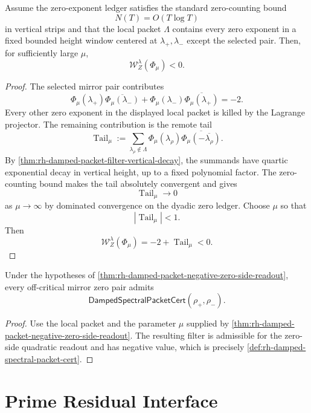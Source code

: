 \begin{theorem}
\label{thm:rh-damped-packet-negative-zero-side-readout}
Assume the zero-exponent ledger satisfies the standard zero-counting
bound
$$
N(T)=O(T\log T)
$$
in vertical strips and that the local packet $\Lambda$ contains every
zero exponent in a fixed bounded height window centered at
$\lambda_+,\lambda_-$ except the selected pair.  Then, for sufficiently
large $\mu$,
$$
\mathcal W_Z^\lambda(\Phi_\mu)<0.
$$
\end{theorem}

\begin{proof}
The selected mirror pair contributes
$$
\Phi_\mu(\lambda_+)\overline{\Phi_\mu(\lambda_-)}
+
\Phi_\mu(\lambda_-)\overline{\Phi_\mu(\lambda_+)}
=
-2.
$$
Every other zero exponent in the displayed local packet is killed by
the Lagrange projector.  The remaining contribution is the remote tail
$$
\operatorname{Tail}_\mu
:=
\sum_{\lambda_\rho\notin\Lambda}
\Phi_\mu(\lambda_\rho)
\overline{\Phi_\mu(-\overline{\lambda_\rho})}.
$$
By \autoref{thm:rh-damped-packet-filter-vertical-decay}, the summands
have quartic exponential decay in vertical height, up to a fixed
polynomial factor.  The zero-counting bound makes the tail absolutely
convergent and gives
$$
\operatorname{Tail}_\mu\to0
$$
as $\mu\to\infty$ by dominated convergence on the dyadic zero ledger.
Choose $\mu$ so that
$$
|\operatorname{Tail}_\mu|<1.
$$
Then
$$
\mathcal W_Z^\lambda(\Phi_\mu)
=
-2+\operatorname{Tail}_\mu
<
0.
$$
\end{proof}

\begin{corollary}
\label{cor:rh-offcritical-mirrors-supply-damped-spectral-packets}
Under the hypotheses of
\autoref{thm:rh-damped-packet-negative-zero-side-readout}, every
off-critical mirror zero pair admits
$$
\mathsf{DampedSpectralPacketCert}(\rho_+,\rho_-).
$$
\end{corollary}

\begin{proof}
Use the local packet and the parameter $\mu$ supplied by
\autoref{thm:rh-damped-packet-negative-zero-side-readout}.  The
resulting filter is admissible for the zero-side quadratic readout and
has negative value, which is precisely
\autoref{def:rh-damped-spectral-packet-cert}.
\end{proof}

\section{Prime Residual Interface}
\label{sec:rh-damped-spectral-prime-residual-interface}

